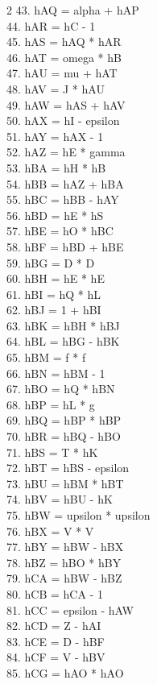 \documentclass[10pt]{article}
\begin{document}
\begin{multicols}{2}
43. hAQ = alpha + hAP\\
44. hAR = hC - 1\\
45. hAS = hAQ * hAR\\
46. hAT = omega * hB\\
47. hAU = mu + hAT\\
48. hAV = J * hAU\\
49. hAW = hAS + hAV\\
50. hAX = hI - epsilon\\
51. hAY = hAX - 1\\
52. hAZ = hE * gamma\\
53. hBA = hH * hB\\
54. hBB = hAZ + hBA\\
55. hBC = hBB - hAY\\
56. hBD = hE * hS\\
57. hBE = hO * hBC\\
58. hBF = hBD + hBE\\
59. hBG = D * D\\
60. hBH = hE * hE\\
61. hBI = hQ * hL\\
62. hBJ = 1 + hBI\\
63. hBK = hBH * hBJ\\
64. hBL = hBG - hBK\\
65. hBM = f * f\\
66. hBN = hBM - 1\\
67. hBO = hQ * hBN\\
68. hBP = hL * g\\
69. hBQ = hBP * hBP\\
70. hBR = hBQ - hBO\\
71. hBS = T * hK\\
72. hBT = hBS - epsilon\\
73. hBU = hBM * hBT\\
74. hBV = hBU - hK\\
75. hBW = upsilon * upsilon\\
76. hBX = V * V\\
77. hBY = hBW - hBX\\
78. hBZ = hBO * hBY\\
79. hCA = hBW - hBZ\\
80. hCB = hCA - 1\\
81. hCC = epsilon - hAW\\
82. hCD = Z - hAI\\
83. hCE = D - hBF\\
84. hCF = V - hBV\\
85. hCG = hAO * hAO\\

\end{multicols}
\end{document}
